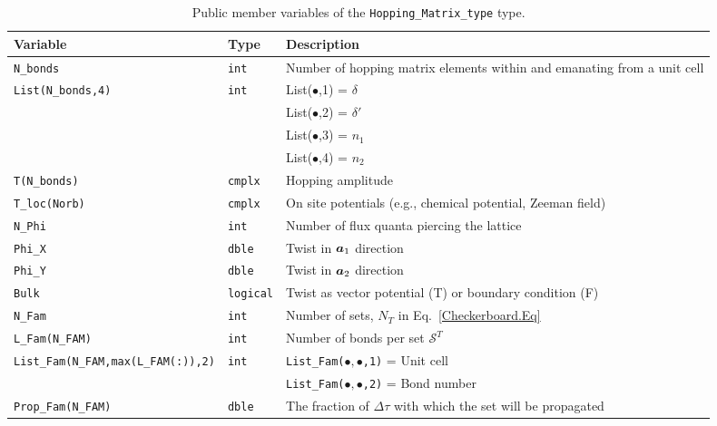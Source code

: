 \begin{table}[h]
	\begin{center}
		\begin{tabular}{@{} p{} @{} p{} p{} @{}}\toprule
			Variable                 & Type            & Description \\\midrule
			\texttt{N\_bonds}        & \texttt{int}    & Number of  hopping  matrix elements within and  emanating from   a unit cell   \\
			\texttt{List(N\_bonds,4)}& \texttt{int}    & List($\bullet$,1) =   $\delta$ \\
			&                 & List($\bullet$,2) =   $\delta'$ \\
			&                 & List($\bullet$,3) =   $n_1$     \\
			&                 & List($\bullet$,4) =   $n_2$     \\ 
			\texttt{T(N\_bonds)}     & \texttt{cmplx}  & Hopping amplitude   \\
			\texttt{T\_loc(Norb)}    & \texttt{cmplx}  & On site  potentials (e.g., chemical potential, Zeeman field)   \\
			\texttt{N\_Phi}          & \texttt{int}    & Number of  flux quanta piercing the lattice   \\
			\texttt{Phi\_X}          & \texttt{dble}   & Twist in $\boldsymbol{a}_1$  direction   \\
			\texttt{Phi\_Y}          & \texttt{dble}   & Twist in $\boldsymbol{a}_2$  direction   \\
			\texttt{Bulk}            & \texttt{logical}& Twist as vector potential (T) or  boundary condition (F)  \\
			\texttt{N\_Fam}          & \texttt{int}    & Number of  sets, $N_T$ in Eq.~\eqref{Checkerboard.Eq}   \\
			\texttt{L\_Fam(N\_FAM)}  & \texttt{int}    & Number of bonds per set $\mathcal{S}^{T}$ \\    
			\texttt{List\_Fam(N\_FAM,max(L\_FAM(:)),2)}& \texttt{int} & \texttt{List\_Fam($ \bullet,\bullet $,1)} =  Unit cell \\
			&                        &          \texttt{List\_Fam($\bullet,\bullet$,2)} =   Bond number \\
			\texttt{Prop\_Fam(N\_FAM)} & \texttt{dble}         & The fraction of $\Delta \tau$ with which the set will be propagated   \\\bottomrule
		\end{tabular}
		\caption{Public member variables of the \texttt{Hopping\_Matrix\_type}  type.
			\label{table:Hopping_matrix}}
	\end{center}
\end{table}

